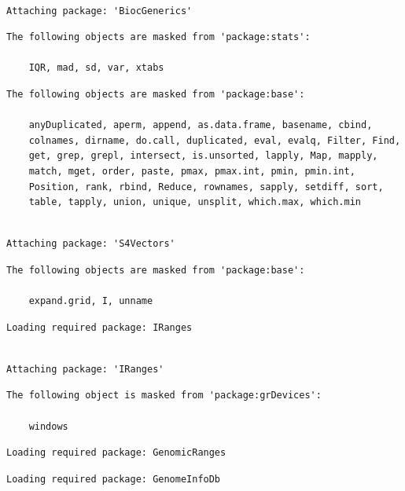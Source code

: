 \documentclass[
  letterpaper,
  DIV=11,
  numbers=noendperiod]{scrartcl}
\begin{document}
\begin{verbatim}

Attaching package: 'BiocGenerics'
\end{verbatim}

\begin{verbatim}
The following objects are masked from 'package:stats':

    IQR, mad, sd, var, xtabs
\end{verbatim}

\begin{verbatim}
The following objects are masked from 'package:base':

    anyDuplicated, aperm, append, as.data.frame, basename, cbind,
    colnames, dirname, do.call, duplicated, eval, evalq, Filter, Find,
    get, grep, grepl, intersect, is.unsorted, lapply, Map, mapply,
    match, mget, order, paste, pmax, pmax.int, pmin, pmin.int,
    Position, rank, rbind, Reduce, rownames, sapply, setdiff, sort,
    table, tapply, union, unique, unsplit, which.max, which.min
\end{verbatim}

\begin{verbatim}

Attaching package: 'S4Vectors'
\end{verbatim}

\begin{verbatim}
The following objects are masked from 'package:base':

    expand.grid, I, unname
\end{verbatim}

\begin{verbatim}
Loading required package: IRanges
\end{verbatim}

\begin{verbatim}

Attaching package: 'IRanges'
\end{verbatim}

\begin{verbatim}
The following object is masked from 'package:grDevices':

    windows
\end{verbatim}

\begin{verbatim}
Loading required package: GenomicRanges
\end{verbatim}

\begin{verbatim}
Loading required package: GenomeInfoDb
\end{verbatim}
\end{document}
